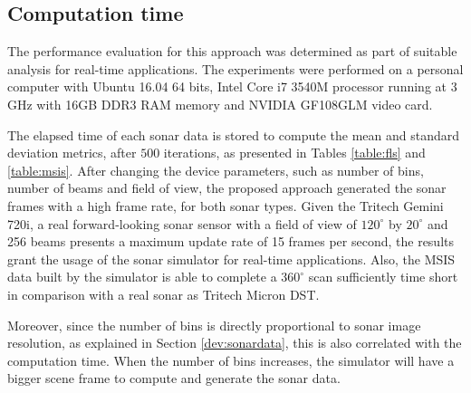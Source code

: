 \documentclass[final,5p,times]{elsarticle}
\begin{document}
\subsection{Computation time}

The performance evaluation for this approach was determined as part of suitable analysis for real-time applications. The experiments were performed on a personal computer with Ubuntu 16.04 64 bits, Intel Core i7 3540M processor running at 3 GHz with 16GB DDR3 RAM memory and NVIDIA GF108GLM video card.

The elapsed time of each sonar data is stored to compute the mean and standard deviation metrics, after $500$ iterations, as presented in Tables \ref{table:fls} and \ref{table:msis}. After changing the device parameters, such as number of bins, number of beams and field of view, the proposed approach generated the sonar frames with a high frame rate, for both sonar types. Given the Tritech Gemini 720i, a real forward-looking sonar sensor with a field of view of $120^{\circ}$ by $20^{\circ}$ and 256 beams presents a maximum update rate of 15 frames per second, the results grant the usage of the sonar simulator for real-time applications. Also, the MSIS data built by the simulator is able to complete a $360^{\circ}$ scan sufficiently time short in comparison with a real sonar as Tritech Micron DST.

Moreover, since the number of bins is directly proportional to sonar image resolution, as explained in Section \ref{dev:sonardata}, this is also correlated with the computation time. When the number of bins increases, the simulator will have a bigger scene frame to compute and generate the sonar data.
\end{document}
